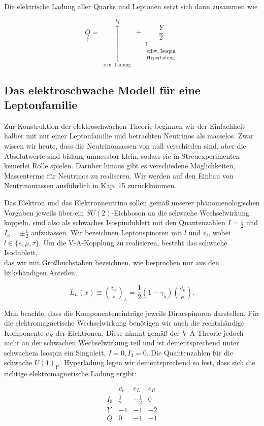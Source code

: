 \documentclass[10pt, letterpaper]{article}
\begin{document}
Die elektrische Ladung aller Quarks und Leptonen setzt sich dann zusammen wie

$$
\underset{\uparrow}{Q}=\underset{\text { e.m. Ladung }}{\stackrel{I_{3}}{\uparrow}}+\underset{\substack{\uparrow \\ \text { schw. Isospin } \\ \text { Hyperladung }}}{\frac{Y}{2}}
$$

\subsection*{Das elektroschwache Modell für eine Leptonfamilie}
Zur Konstruktion der elektroschwachen Theorie beginnen wir der Einfachheit halber mit nur einer Leptonfamilie und betrachten Neutrinos als masselos. Zwar wissen wir heute, dass die Neutrinomassen von null verschieden sind, aber die Absolutwerte sind bislang unmessbar klein, sodass sie in Streuexperimenten keinerlei Rolle spielen. Darüber hinaus gibt es verschiedene Möglichkeiten, Massenterme für Neutrinos zu realiseren. Wir werden auf den Einbau von Neutrinomassen ausführlich in Kap. 15 zurückkommen.

Das Elektron und das Elektronneutrino sollen gemäß unserer phänomenologischen Vorgaben jeweils über ein $S U(2)$-Eichboson an die schwache Wechselwirkung koppeln, sind also als schwaches Isospindublett mit den Quantenzahlen $I=\frac{1}{2}$ und $I_{3}= \pm \frac{1}{2}$ aufzufassen. Wir bezeichnen Leptonspinoren mit $l$ und $v_{l}$, wobei $l \in\{e, \mu, \tau\}$. Um die V-A-Kopplung zu realisieren, besteht das schwache Isodublett,\\
das wir mit Großbuchstaben bezeichnen, wie besprochen nur aus den linkshändigen Anteilen,

$$
L_{L}(x) \equiv\binom{v_{e}}{e}_{L}=\frac{1}{2}\left(1-\gamma_{5}\right)\binom{v_{e}}{e} .
$$

Man beachte, dass die Komponenteneinträge jeweils Diracspinoren darstellen. Für die elektromagnetische Wechselwirkung benötigen wir auch die rechtshändige Komponente $e_{R}$ der Elektronen. Diese nimmt gemäß der V-A-Theorie jedoch nicht an der schwachen Wechselwirkung teil und ist dementsprechend unter schwachem Isospin ein Singulett, $I=0, I_{3}=0$. Die Quantenzahlen für die schwache $U(1)_{Y^{-}}$ Hyperladung legen wir dementsprechend so fest, dass sich die richtige elektromagnetische Ladung ergibt:

$$
\begin{array}{c|ccc} 
& v_{e} & e_{L} & e_{R} \\
\hline I_{3} & \frac{1}{2} & -\frac{1}{2} & 0 \\
Y & -1 & -1 & -2 \\
Q & 0 & -1 & -1
\end{array}
$$
\end{document}
